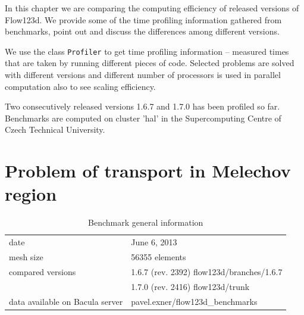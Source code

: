 %
%
%
%
%
%
%
%


In this chapter we are comparing the computing efficiency of released versions of Flow123d. We provide some 
of the time profiling information gathered from benchmarks, point out and discuss the differences among different 
versions.

We use the class \verb'Profiler' to get time profiling information -- measured times that are taken by running different 
pieces of code. Selected problems are solved with different versions and different number 
of processors is used in parallel computation also to see scaling efficiency.

Two consecutively released versions 1.6.7 and 1.7.0 has been profiled so far. 
Benchmarks are computed on cluster 'hal' in the Supercomputing Centre of Czech Technical University.


\section{Problem of transport in Melechov region}

\begin{table}[!htb]
\centering
\begin{tabular}{ll}
date & June 6, 2013 \\
mesh size & 56355 elements \\
compared versions & 1.6.7 (rev. 2392) flow123d/branches/1.6.7 \\
                  & 1.7.0 (rev. 2416) flow123d/trunk \\
data available on Bacula server & pavel.exner/flow123d\_benchmarks
\end{tabular}
\caption{Benchmark general information}
\label{tab:bench1}
\end{table}

